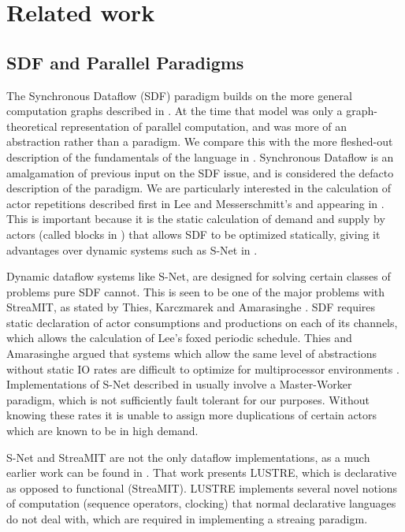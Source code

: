 \section{Related work}

\subsection{SDF and Parallel Paradigms}

The Synchronous Dataflow (SDF) paradigm builds on the more general computation graphs described in \cite{kar66}.
At the time that model was only a graph-theoretical representation of parallel computation, and was more of an abstraction rather than a paradigm.
We compare this with the more fleshed-out description of the fundamentals of the language in \cite{sdfBook}.
Synchronous Dataflow is an amalgamation of previous input on the SDF issue, and is considered the defacto description of the paradigm.
We are particularly interested in the calculation of actor repetitions described first in Lee and Messerschmitt's \cite{lee87} and appearing in \cite{sdfBook}.
This is important because it is the static calculation of demand and supply by actors (called blocks in \cite{lee87}) that allows SDF to be optimized statically, giving it advantages over dynamic systems such as S-Net in \cite{pen09}.

Dynamic dataflow systems like S-Net, are designed for solving certain classes of problems pure SDF cannot.
This is seen to be one of the major problems with StreaMIT, as stated by Thies, Karczmarek and Amarasinghe \cite{thies02}.
SDF requires static declaration of actor consumptions and productions on each of its channels, which allows the calculation of Lee's foxed periodic schedule.
Thies and Amarasinghe argued that systems which allow the same level of abstractions without static IO rates are difficult to optimize for multiprocessor environments \cite{thies10}.
Implementations of S-Net described in \cite{pen09} usually involve a Master-Worker paradigm, which is not sufficiently fault tolerant for our purposes.
Without knowing these rates it is unable to assign more duplications of certain actors which are known to be in high demand.

S-Net and StreaMIT are not the only dataflow implementations, as a much earlier work can be found in \cite{cas87}.
That work presents LUSTRE, which is declarative as opposed to functional (StreaMIT).
LUSTRE implements several novel notions of computation (sequence operators, clocking) that normal declarative languages do not deal with, which are required in implementing a streaing paradigm.

